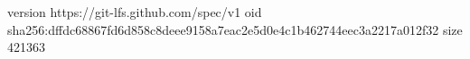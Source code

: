 version https://git-lfs.github.com/spec/v1
oid sha256:dffdc68867fd6d858c8deee9158a7eac2e5d0e4c1b462744eec3a2217a012f32
size 421363

